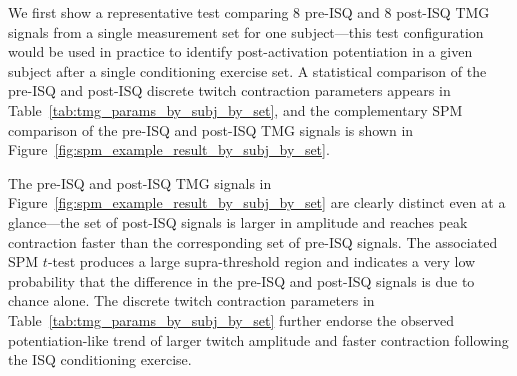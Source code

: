 \documentclass[utf8]{FrontiersinHarvard}
\begin{document}
We first show a representative test comparing 8 pre-ISQ and 8 post-ISQ TMG signals from a single measurement set for one subject---this test configuration would be used in practice to identify post-activation potentiation in a given subject after a single conditioning exercise set.
A statistical comparison of the pre-ISQ and post-ISQ discrete twitch contraction parameters appears in Table~\ref{tab:tmg_params_by_subj_by_set},
and the complementary SPM comparison of the pre-ISQ and post-ISQ TMG signals is shown in Figure~\ref{fig:spm_example_result_by_subj_by_set}.

The pre-ISQ and post-ISQ TMG signals in Figure~\ref{fig:spm_example_result_by_subj_by_set} are clearly distinct even at a glance---the set of post-ISQ signals is larger in amplitude and reaches peak contraction faster than the corresponding set of pre-ISQ signals.
The associated SPM $ t $-test produces a large supra-threshold region and indicates a very low probability that the difference in the pre-ISQ and post-ISQ signals is due to chance alone.
The discrete twitch contraction parameters in Table~\ref{tab:tmg_params_by_subj_by_set} further endorse the observed potentiation-like trend of larger twitch amplitude and faster contraction following the ISQ conditioning exercise.

\begin{table}
    \centering
    \caption{A statistical comparison of pre- and post-ISQ TMG parameters from subject 1's measurement set 1.
    The twitch contraction parameters in each row were defined in Section~\ref{sss:discrete_twitch_params}.
    The columns $ \mu_{\mathrm{pre}} $ and $ \mu_{\mathrm{post}} $ show the mean value of each parameter across all eight measurements in the set, $ \sigma_{\mathrm{pre}} $ and $ \sigma_{\mathrm{post}} $ show the corresponding standard deviations, and the ``change'' column shows the percent change in each parameter relative to the pre-ISQ value.
    The $ \lvert t \rvert $ column shows the $ t $-statistic from a paired, two-tailed Student's $ t $-test comparing the (pre-ISQ, post-ISQ) pairs for each parameter, and the $ p $ column shows the associated $ p $ value.}
    \vspace{1ex}
    \renewcommand{\arraystretch}{1.2}
    
    \label{tab:tmg_params_by_subj_by_set}
\end{table}
\end{document}
